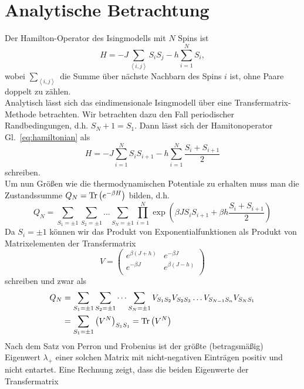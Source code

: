 


  \section{Analytische Betrachtung}
  Der Hamilton-Operator des Isingmodells mit $N$ Spins ist
  \begin{equation}
	H=-J\sum\limits_{\left<i, j\right>}S_i S_j -h\sum\limits_{i=1}^N S_i, \label{eq:hamiltonian}
  \end{equation}
  wobei $\sum\limits_{\left<i, j\right>}$ die Summe über nächste Nachbarn des Spins $i$ ist, ohne Paare doppelt zu zählen. \\
  Analytisch lässt sich das eindimensionale Isingmodell über eine Transfermatrix-Methode betrachten. Wir betrachten dazu den Fall periodischer Randbedingungen, d.h. $S_N+1=S_1$. Dann lässt sich der Hamitonoperator Gl.~\eqref{eq:hamiltonian} als
  \begin{equation*}
	H=-J\sum\limits_{i=1}^N S_i S_{i+1}-h\sum\limits_{i=1}^N \frac{S_i+S_{i+1}}{2}
  \end{equation*}
  schreiben. \\
  Um nun Größen wie die thermodynamischen Potentiale zu erhalten muss man die Zustandssumme $Q_N=\operatorname{Tr}\left(e^{-\beta H}\right)$ bilden, d.h.
  \begin{equation*}
	Q_N=\sum\limits_{S_1=\pm 1}\sum\limits_{S_2=\pm 1}\dots\sum\limits_{S_N=\pm 1}\prod\limits_{i=1}^N \exp\left(\beta J S_i S_{i+1}+\beta h \frac{S_i+S_{i+1}}{2}\right)
  \end{equation*}
  Da $S_i=\pm 1$ können wir das Produkt von Exponentialfunktionen als Produkt von Matrixelementen der Transfermatrix
  \begin{equation*}
		V=\begin{pmatrix}
			e^{\beta\left(J+h\right)} & e^{-\beta J} \\
			e^{-\beta J} & e^{\beta\left(J-h\right)} \\
		\end{pmatrix}
  \end{equation*}
  schreiben und zwar als
  \begin{align*}
				Q_N&=\sum\limits_{S_1=\pm 1}\sum\limits_{S_2=\pm 1}\dots\sum\limits_{S_N=\pm 1}V_{S_1 S_2} V_{S_2 S_3} \dots V_{S_{N-1}S_n} V_{S_N S_1} \\
							&=\sum\limits_{S_1=\pm 1}{\left(V^N\right)}_{S_1 S_1}=\operatorname{Tr}\left(V^N\right)
  \end{align*}
		Nach dem Satz von Perron und Frobenius ist der größte (betragsmäßig) Eigenwert $\lambda_+$ einer solchen Matrix mit nicht-negativen Einträgen positiv und nicht entartet. Eine Rechnung zeigt, dass die beiden Eigenwerte der Transfermatrix
